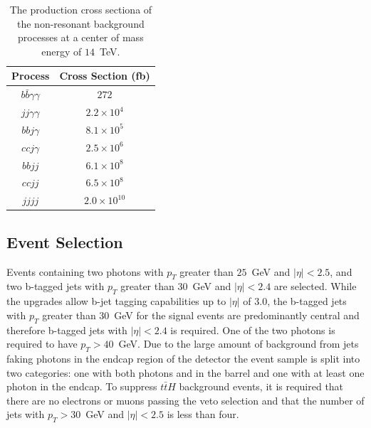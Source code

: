 \begin{table}[!ht]
\begin{center} 
\begin{tabular}{|c|c|}
\hline
Process                                           &   Cross Section (fb)   \\ \hline
$b \bar{b} \gamma\gamma$                          &   $272$                            \\
$jj \gamma\gamma$                                 &   $2.2 \times 10^{4}$              \\
$bb j\gamma$                                      &   $8.1 \times 10^{5}$              \\
$cc j\gamma$                                      &   $2.5 \times 10^{6}$              \\
$bb jj$                                           &   $6.1 \times 10^{8}$              \\
$cc jj$                                           &   $6.5 \times 10^{8}$              \\
$jjjj$                                            &   $2.0 \times 10^{10}$             \\ \hline
\end{tabular}
\caption{ The production cross sectiona of the non-resonant background processes at a center of mass energy 
of $14$~TeV.}
\label{tab:CrossSections}
\end{center}
\end{table}

\subsection{Event Selection}
\label{sec:eventselection}
 
Events containing two photons with $p_{T}$ greater than $25$~GeV
and $|\eta|<2.5$, and two b-tagged jets with $p_{T}$ greater than $30$~GeV and $|\eta|<2.4$ are selected. While the \phasetwo upgrades allow b-jet tagging capabilities up to $|\eta|$ of $3.0$, the b-tagged jets with $p_{T}$ greater than $30$~GeV for the signal events are predominantly central and therefore b-tagged jets with $|\eta|<2.4$ is required. One of the two photons is required to have $p_{T} > 40$~GeV. Due to the large amount of background from jets faking photons in the endcap region of the detector the event sample is split into two categories: one with both photons and in the barrel and one with at least one photon in the endcap. To suppress $t\bar{t}H$ background events, it is required that there are no electrons or muons passing the veto selection and that  the number of jets with $p_{T}>30$~GeV and $|\eta|<2.5$ is less than four. 

